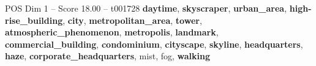 \begin{textsample}{POS Dim 1 – Score 18.00 – t001728}  \label{ex:f1_pos_029}
\textbf{daytime}, \textbf{skyscraper}, \textbf{urban\_area}, \textbf{high-rise\_building}, \textbf{city}, \textbf{metropolitan\_area}, \textbf{tower}, \textbf{atmospheric\_phenomenon}, \textbf{metropolis}, \textbf{landmark}, \textbf{commercial\_building}, \textbf{condominium}, \textbf{cityscape}, \textbf{skyline}, \textbf{headquarters}, \textbf{haze}, \textbf{corporate\_headquarters}, mist, fog, \textbf{walking}

\end{textsample}
